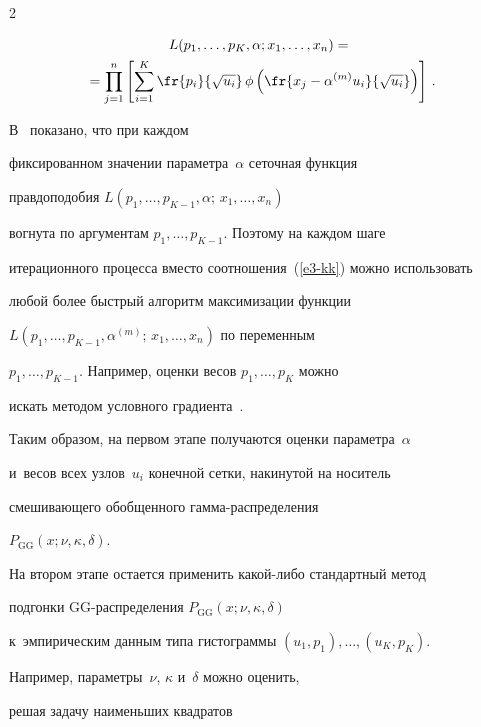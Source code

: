\begin{multicols}{2}
\noindent


\begin{multline*}


L(p_1,\ldots,p_K,\alpha;x_1,\ldots,x_n)={}\\


{}=


\prod\limits_{j=1}^n\left[\sum\limits_{i=1}^K


\fr{p_i}{\sqrt{u_i}}\,\phi\left(\fr{x_j-\alpha^{(m)}u_i}{\sqrt{u_i}}\right)\right]\,.


\end{multline*}


В~\cite[разд.~5.7.4]{Korolev2011-2} показано, что при каждом


фиксированном значении параметра~$\alpha$ сеточная функция


правдоподобия $L(p_1,\ldots,p_{K-1},\alpha;\,x_1,\ldots,x_n)$


вогнута по аргументам $p_1,\ldots,p_{K-1}$. Поэтому на каждом шаге


итерационного процесса вмес\-то соотношения~(\ref{e3-kk}) можно использовать


любой более быстрый алгоритм максимизации функции


$L(p_1,\ldots,p_{K-1},\alpha^{(m)};\,x_1,\ldots,x_n)$ по переменным


$p_1,\ldots,p_{K-1}$. Например, оценки весов $p_1,\ldots,p_K$ можно


искать методом условного градиента~\cite{Korolev2011-2, kn2010}.





Таким образом, на первом этапе получаются оценки параметра~$\alpha$


и~весов всех узлов~$u_i$ конечной сетки, накинутой на носитель


смешивающего обобщенного гам\-ма-рас\-пре\-де\-ле\-ния


$P_{\mathrm{GG}}(x;\nu,\kappa,\delta)$.





На втором этапе остается применить ка\-кой-ли\-бо стандартный метод


подгонки GG-рас\-пре\-де\-ле\-ния $P_{\mathrm{GG}}(x;\nu,\kappa,\delta)$ 


к~эмпирическим данным типа гистограммы $(u_1, p_1),\ldots, (u_K, p_K)$. 


Например, параметры~$\nu$, $\kappa$ и~$\delta$ можно оценить,


решая задачу наименьших квадратов



\end{multicols}
